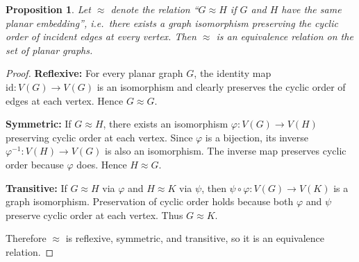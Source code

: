 \documentclass{article}
\theoremstyle{plain}
\newtheorem{proposition}{Proposition}
\theoremstyle{definition}
\theoremstyle{remark}
\begin{document}
\begin{proposition}
Let $\approx$ denote the relation ``$G \approx H$ if $G$ and $H$ have the
same planar embedding'', i.e.\ there exists a graph isomorphism preserving
the cyclic order of incident edges at every vertex. Then $\approx$ is an
equivalence relation on the set of planar graphs.
\end{proposition}

\begin{proof}
\textbf{Reflexive:}  
For every planar graph $G$, the identity map
$\mathrm{id}:V(G)\to V(G)$ is an isomorphism and clearly preserves the
cyclic order of edges at each vertex. Hence $G\approx G$.

\medskip
\noindent
\textbf{Symmetric:}  
If $G\approx H$, there exists an isomorphism
$\varphi:V(G)\to V(H)$ preserving cyclic order at each vertex.
Since $\varphi$ is a bijection, its inverse $\varphi^{-1}:V(H)\to V(G)$
is also an isomorphism. The inverse map preserves cyclic order because
$\varphi$ does. Hence $H\approx G$.

\medskip
\noindent
\textbf{Transitive:}  
If $G\approx H$ via $\varphi$ and $H\approx K$ via $\psi$, then
$\psi\circ\varphi:V(G)\to V(K)$ is a graph isomorphism. Preservation of
cyclic order holds because both $\varphi$ and $\psi$ preserve cyclic
order at each vertex. Thus $G\approx K$.

\medskip
Therefore $\approx$ is reflexive, symmetric, and transitive, so it is an
equivalence relation.
\end{proof}
\end{document}

